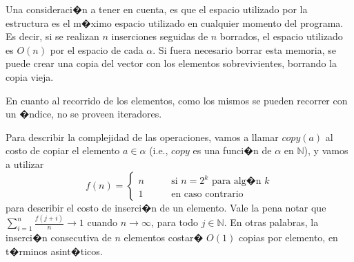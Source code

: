 \documentclass[a4paper,10pt]{article}
\begin{document}

Una consideraci�n a tener en cuenta, es que el espacio utilizado por la estructura es el m�ximo espacio utilizado en cualquier momento del programa.  Es decir, si se realizan $n$ inserciones seguidas de $n$ borrados, el espacio utilizado es $O(n)$ por el espacio de cada $\alpha$.  Si fuera necesario borrar esta memoria, se puede crear una copia del vector con los elementos sobrevivientes, borrando la copia vieja.

En cuanto al recorrido de los elementos, como los mismos se pueden recorrer con un �ndice, no se proveen iteradores.

Para describir la complejidad de las operaciones, vamos a llamar $copy(a)$ al costo de copiar el elemento $a \in \alpha$ (i.e., $copy$ es una funci�n de $\alpha$ en $\mathbb{N}$), y vamos a utilizar
\[f(n) = \begin{cases} n & \qquad \text{si $n = 2^k$ para alg�n $k$} \\
                      1 & \qquad \text{en caso contrario}
        \end{cases}
\]
para describir el costo de inserci�n de un elemento.  Vale la pena notar que $\displaystyle\sum_{i=1}^n \frac{f(j+i)}{n} \to 1$ cuando $n \to \infty$, para todo $j \in \mathbb{N}$.  En otras palabras, la inserci�n consecutiva de $n$ elementos costar� $O(1)$ copias por elemento, en t�rminos asint�ticos.
\end{document}
